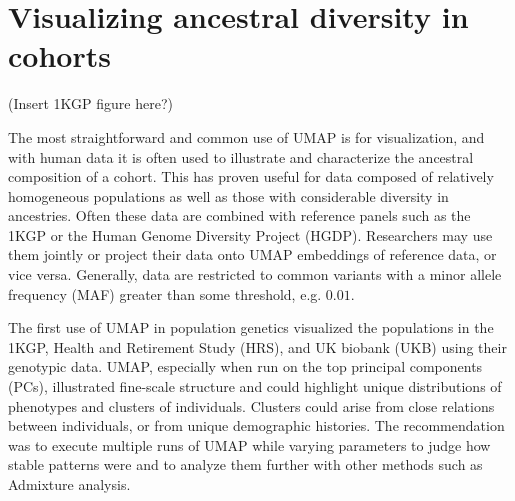 \documentclass[12pt]{article}
\begin{document}

\section*{Visualizing ancestral diversity in cohorts}
(Insert 1KGP figure here?)

The most straightforward and common use of UMAP is for visualization, and with human data it is often used to illustrate and characterize the ancestral composition of a cohort. This has proven useful for data composed of relatively homogeneous populations as well as those with considerable diversity in ancestries. Often these data are combined with reference panels such as the 1KGP or the Human Genome Diversity Project (HGDP)\cite{cann2002human}. Researchers may use them jointly or project their data onto UMAP embeddings of reference data, or vice versa. Generally, data are restricted to common variants with a minor allele frequency (MAF) greater than some threshold, e.g. $0.01$.

The first use of UMAP in population genetics visualized the populations in the 1KGP, Health and Retirement Study (HRS)\cite{juster1995overview}, and UK biobank (UKB)\cite{sudlow2015uk} using their genotypic data. UMAP, especially when run on the top principal components (PCs), illustrated fine-scale structure and could highlight unique distributions of phenotypes and clusters of individuals. Clusters could arise from close relations between individuals, or from unique demographic histories. The recommendation was to execute multiple runs of UMAP while varying parameters to judge how stable patterns were and to analyze them further with other methods such as Admixture analysis\cite{diaz-papkovich_umap_2019}.
\end{document}
